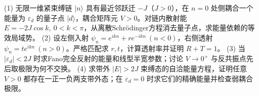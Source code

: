 (1) 无限一维紧束缚链 \(|n\rangle\) 具有最近邻跃迁 \(-J\)（\(J>0\)），在 \(n=0\) 处侧耦合一个能量为 \(\varepsilon_d\) 的量子点 \(|d\rangle\)，耦合矩阵元 \(V>0\)。对链内散射能 \(E=-2J\cos k,\ 0<k<\pi\)，从离散Schrödinger方程消去量子点，求能量依赖的等效局域势。
(2) 设左侧入射 \(\psi_n=e^{ikn}+re^{-ikn}\ (n<0)\)，右侧透射 \(\psi_n=te^{ikn}\ (n>0)\)。严格匹配求 \(r,t\)，计算透射率并证明 \(R+T=1\)。
(3) 当 \(|\varepsilon_d|<2J\) 时求Fano完全反射的能量和线型半宽参数；讨论 \(V\to0^+\) 与反共振点先后取极限为何不交换。
(4) 求带外 \(|E|>2J\) 束缚态的自洽能量方程，证明任意 \(V>0\) 都存在一正一负两支带外态；在 \(\varepsilon_d=0\) 时求它们的精确能量并检查弱耦合极限。
